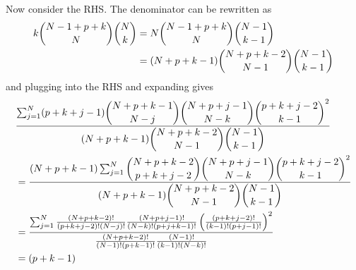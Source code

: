 \documentclass[11pt]{article}
\theoremstyle{definition}
\theoremstyle{remark}
\numberwithin{equation}{section}
\begin{document}
Now consider the RHS. The denominator can be rewritten as 
\begin{align*} 
k \dbinom{N-1+p+k}{N}\dbinom{N}{k} &= N \dbinom{N-1+p+k}{N}\dbinom{N-1}{k-1} \\ 
&= (N+p+k-1) \dbinom{N+p+k-2}{N-1} \dbinom{N-1}{k-1} 
\end{align*} and plugging into the RHS and expanding gives 
\begin{align*}
&\frac{\sum_{j=1}^N (p+k+j-1) \dbinom{N+p+k-1}{N-j} \dbinom{N+p+j-1}{N-k} \dbinom{p+k+j-2}{k-1}^2 }{ (N+p+k-1) \dbinom{N+p+k-2}{N-1} \dbinom{N-1}{k-1} }  \\
&= \frac{ (N+p+k-1)\sum_{j=1}^N  \dbinom{N+p+k-2}{p+k+j-2} \dbinom{N+p+j-1}{N-k} \dbinom{p+k+j-2}{k-1}^2 }{ (N+p+k-1) \dbinom{N+p+k-2}{N-1} \dbinom{N-1}{k-1} }  \\
&= \frac{\sum_{j=1}^N \frac{(N+p+k-2)!}{(p+k+j-2)!(N-j)!} \frac{(N+p+j-1)!}{(N-k)! (p+j+k-1)!} \left(\frac{(p+k+j-2)!}{(k-1)! (p+j-1)!}\right)^2}{\frac{(N+p+k-2)!}{(N-1)! (p+k-1)!} \frac{(N-1)!}{(k-1)! (N-k)!}}
\\
&= (p+k-1)
\end{align*}
\end{document}
